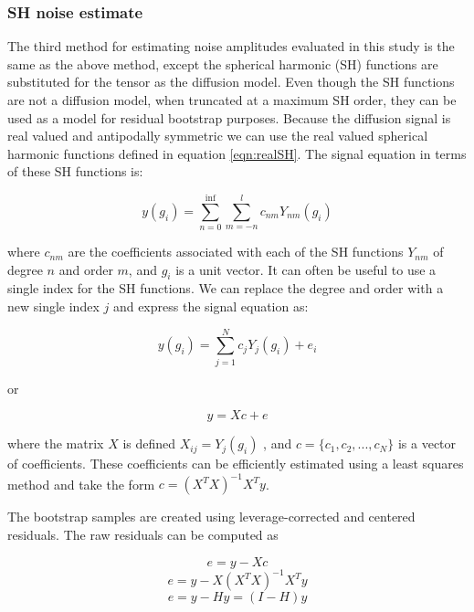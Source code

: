 \subsubsection{SH noise estimate}

The third method for estimating noise amplitudes evaluated in this study
is the same as the above method, except the spherical harmonic (SH)
functions are substituted for the tensor as the diffusion model. Even though the SH functions
are not a diffusion model, when truncated at a maximum SH order, they
can be used as a model for residual bootstrap purposes. Because the diffusion signal
is real valued and antipodally symmetric we can use the real valued spherical harmonic functions
defined in equation \ref{eqn:realSH}. The signal equation in terms of these SH functions is:

\begin{equation}
y(g_i) = \sum_{n=0}^{\inf} \sum_{m=-n}^l{c_{nm}Y_{nm}(g_i)}
\end{equation}

where $c_{nm}$ are the coefficients associated with each of the SH functions $Y_{nm}$ of degree $n$ and order $m$, and $g_i$ is a unit vector. It can often be useful to use a single index for the SH functions. We can replace the degree and order with a new single index $j$ and express the signal equation as:

\begin{equation}
y(g_i) = \sum_{j=1}^N{c_jY_j(g_i) + e_i}
\end{equation}

or

\begin{equation}
y = Xc + e
\end{equation}

where the matrix $X$ is defined $X_{ij} = Y_j(g_i)$ , and $c = \{c_1, c_2, ..., c_N\}$ is a vector of coefficients. These
coefficients can be efficiently estimated using a least squares method
and take the form $c = (X^TX)^{-1}X^Ty$.

The bootstrap samples are created using leverage-corrected and centered
residuals. The raw residuals can be computed as

\begin{equation}
e = y - Xc
\end{equation}
\begin{equation}
e = y - X(X^TX)^{-1}X^Ty
\end{equation}
\begin{equation}
e = y - Hy = (I - H)y
\end{equation}

